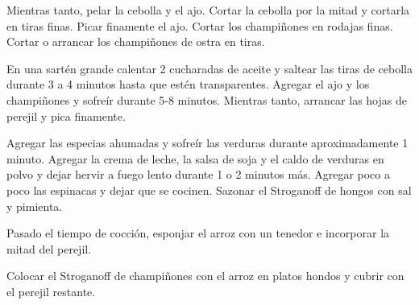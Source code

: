 \begin{recipe}
{        \step Mientras tanto, pelar la cebolla y el ajo. Cortar la cebolla por la mitad y cortarla en tiras finas. Picar finamente el ajo. Cortar los champi\~nones en rodajas finas. Cortar o arrancar los champi\~nones de ostra en tiras.

        \step En una sart\'en grande calentar 2 cucharadas de aceite y saltear las tiras de cebolla durante 3 a 4 minutos hasta que est\'en transparentes. Agregar el ajo y los champi\~nones y sofre\'ir durante 5-8 minutos. Mientras tanto, arrancar las hojas de perejil y pica finamente.

        \step Agregar las especias ahumadas y sofre\'ir las verduras durante aproximadamente 1 minuto. Agregar la crema de leche, la salsa de soja y el caldo de verduras en polvo y dejar hervir a fuego lento durante 1 o 2 minutos m\'as. Agregar poco a poco las espinacas y dejar que se cocinen. Sazonar el Stroganoff de hongos con sal y pimienta.

        \step Pasado el tiempo de cocci\'on, esponjar el arroz con un tenedor e incorporar la mitad del perejil.

        \step Colocar el Stroganoff de champi\~nones con el arroz en platos hondos y cubrir con el perejil restante.
    }



    \hint{%

    }

\end{recipe}
